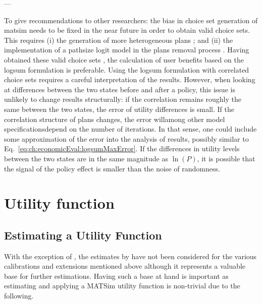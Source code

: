 ---

To give recommendations to other researchers: the bias in choice set generation of \gls{matsim} needs to be fixed in the near future in order to obtain valid choice sets.
%
This requires (i) the generation of more heterogeneous plans \citep[see, e.g.,][for such attempts in the \acrshort{pt} and in the car mode, respectively]{Moyo2013PhD, NagelKickhoeferJoubert2014HeterogeneousVoTsPROCEDIA}; and (ii) the implementation of a pathsize logit model in the plans removal process \citep[see, e.g.,][]{Grether2014PhD}.
%
Having obtained these valid choice sets \citep{NagelFloetteroed2009IatbrResourceInBook}, the calculation of user benefits based on the logsum formulation is preferable.
%
%
Using the logsum formulation with correlated choice sets requires a careful interpretation of the results. However, when looking at differences between the two states before and after a policy, this issue is unlikely to change results structurally: if the correlation remains roughly the same between the two states, the error of utility differences is small. If the correlation structure of plans changes, the error will\textemdash among other model specifications\textemdash depend on the number of iterations.
%
%
In that sense, one could include some approximation of the error into the analysis of results, possibly similar to Eq.~\ref{eq:ch:economicEval:logsumMaxError}. If the differences in utility levels between the two states are in the same magnitude as $\ln(P)$, it is possible that the signal of the policy effect is smaller than the noise of randomness.

\section{Utility function}
\label{sec:future-of-scoring-function}


\subsection{Estimating a Utility Function}
\label{sec:estimation}
With the exception of \citet[][]{BalmerEtAl_ResRep_datapuls_2010}, the estimates by \citet[][]{Kickhoefer_MastersThesis_2009} have not been considered for the various calibrations and extensions mentioned above although it represents a valuable base for further estimations. Having such a base at hand is important as estimating and applying a MATSim utility function is non-trivial due to the following. 

